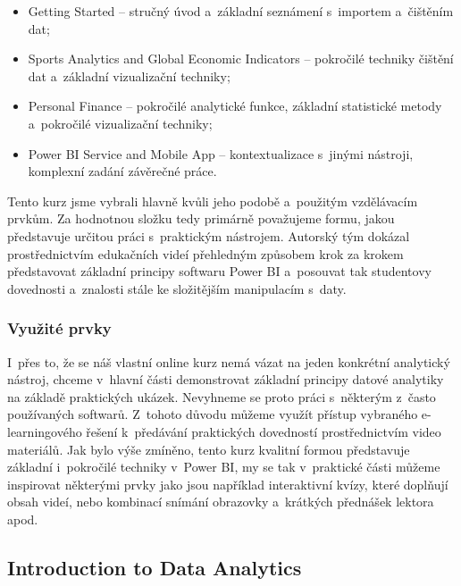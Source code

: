 \begin{itemize}
\tightlist
\item
  Getting Started -- stručný úvod a~základní seznámení s~importem a~čištěním dat;
\item
  Sports Analytics and Global Economic Indicators -- pokročilé techniky čištění dat a~základní vizualizační techniky;
\item
  Personal Finance -- pokročilé analytické funkce, základní statistické metody a~pokročilé vizualizační techniky;
\item
  Power BI Service and Mobile App -- kontextualizace s~jinými nástroji, komplexní zadání závěrečné práce.
\end{itemize}

Tento kurz jsme vybrali hlavně kvůli jeho podobě a~použitým vzdělávacím prvkům. Za hodnotnou složku tedy primárně považujeme formu, jakou představuje určitou práci s~praktickým nástrojem. Autorský tým dokázal prostřednictvím edukačních videí přehledným způsobem krok za krokem představovat základní principy softwaru Power BI a~posouvat tak studentovy dovednosti a~znalosti stále ke složitějším manipulacím s~daty.

\hypertarget{vyuux17eituxe9-prvky-4}{%
\subsubsection{Využité prvky}\label{vyuux17eituxe9-prvky-4}}

I~přes to, že se náš vlastní online kurz nemá vázat na jeden konkrétní analytický nástroj, chceme v~hlavní části demonstrovat základní principy datové analytiky na základě praktických ukázek. Nevyhneme se proto práci s~některým z~často používaných softwarů. Z~tohoto důvodu můžeme využít přístup vybraného e-learningového řešení k~předávání praktických dovedností prostřednictvím video materiálů. Jak bylo výše zmíněno, tento kurz kvalitní formou představuje základní i~pokročilé techniky v~Power BI, my se tak v~praktické části můžeme inspirovat některými prvky jako jsou například interaktivní kvízy, které doplňují obsah videí, nebo kombinací snímání obrazovky a~krátkých přednášek lektora apod.

\hypertarget{introduction-to-data-analytics}{%
\subsection{Introduction to Data Analytics}\label{introduction-to-data-analytics}}

